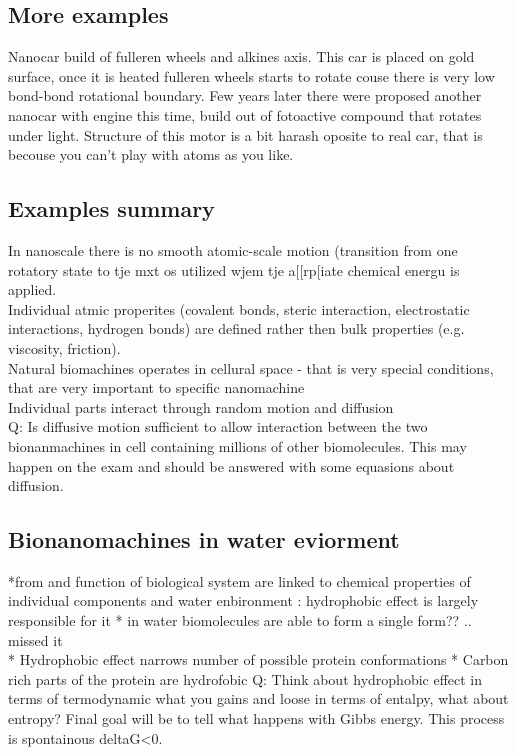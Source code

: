 \documentclass{article}
\begin{document}
\subsection{More examples}
Nanocar build of fulleren wheels and alkines axis. This car is placed on gold surface, once it is heated
fulleren wheels starts to rotate couse there is very low bond-bond rotational boundary.
Few years later there were proposed another nanocar with engine this time, build out of fotoactive compound
that rotates under light. Structure of this motor is a bit harash oposite to real car, that is becouse you
can't play with atoms as you like. 

\subsection{Examples summary}
In nanoscale there is no smooth atomic-scale motion (transition from one rotatory state to tje mxt os utilized
wjem tje a[[rp[iate chemical energu is applied.\\
Individual atmic properites (covalent bonds, steric interaction, electrostatic interactions, hydrogen bonds)
are defined rather then bulk properties (e.g. viscosity, friction).\\
Natural biomachines operates in cellural space - that is very special conditions, that are very important to
specific nanomachine \\
Individual parts interact through random motion and diffusion\\
Q: Is diffusive motion sufficient to allow interaction between the two bionanmachines in cell containing
millions of other biomolecules. This may happen on the exam and should be answered with some equasions about
diffusion.\\

\subsection{Bionanomachines in water eviorment}
*from and function of biological system are linked to chemical properties of individual components and water
enbironment : hydrophobic effect is largely responsible for it
* in water biomolecules are able to form a single form?? .. missed it\\
* Hydrophobic effect narrows number of possible protein conformations
* Carbon rich parts of the protein are hydrofobic
Q: Think about hydrophobic effect in terms of termodynamic what you gains and loose in terms of entalpy, what
about entropy? Final goal will be to tell what happens with Gibbs energy. This process is spontainous deltaG<0.
\end{document}
